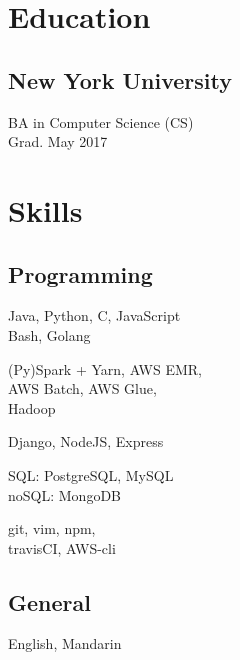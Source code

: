 \documentclass[]{hieudo-build}
\begin{document}
\begin{minipage}[t]{0.34\textwidth} 

\section{Education} 

\subsection{New York University}
BA in Computer Science (CS) \\
Grad. May 2017 \\
\sectionsep


\section{Skills}
\subsection{Programming}
Java, Python, C, JavaScript\\
Bash, Golang
\newline

(Py)Spark + Yarn, AWS EMR, \\
AWS Batch, AWS Glue, \\
Hadoop
\newline

Django, NodeJS, Express
\newline

SQL: PostgreSQL, MySQL\\
noSQL: MongoDB
\newline

git, vim, npm,\\
travisCI, AWS-cli
\newline

\sectionsep

\subsection{General}
English, Mandarin
\newline


\end{minipage}
\end{document}
